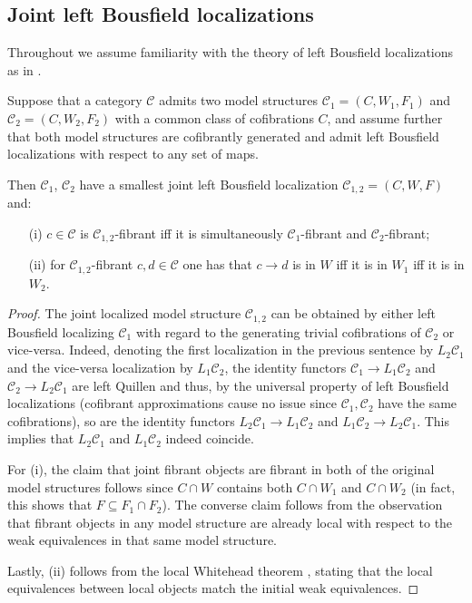 \documentclass[a4paper,10pt
 ,draft
]{article}%
\begin{document}
\subsection{Joint left Bousfield localizations}\label{JOINBOUS SEC}


Throughout we assume familiarity with the theory of left Bousfield localizations as in \cite{Hir03}.

\begin{proposition}\label{COMBMODSTR PROP}
	Suppose that a category $\mathcal{C}$
	admits two model structures $\mathcal{C}_1=(C,W_1,F_1)$ and $\mathcal{C}_2 = (C,W_2,F_2)$
	with a common class of cofibrations $C$,
	and assume further that both model structures are cofibrantly generated and admit left Bousfield localizations with respect to any set of maps.

	Then $\mathcal{C}_1$, $\mathcal{C}_2$ have a smallest joint left Bousfield localization 
	$\mathcal{C}_{1,2}=(C,W,F)$ and:
\begin{itemize}
	\item[(i)] $c \in \mathcal{C}$ is $\mathcal{C}_{1,2}$-fibrant iff it is simultaneously 
	$\mathcal{C}_{1}$-fibrant and $\mathcal{C}_{2}$-fibrant;
	\item[(ii)] for $\mathcal{C}_{1,2}$-fibrant  
	$c,d \in \mathcal{C}$ one has that $c\to d$ is in $W$ iff it is in $W_1$ iff it is in $W_2$.
\end{itemize}
\end{proposition}


\begin{proof}
The joint localized model structure $\mathcal{C}_{1,2}$ can be obtained by either left Bousfield localizing $\mathcal{C}_{1}$ with regard to the generating trivial cofibrations of $\mathcal{C}_{2}$ or vice-versa. Indeed, denoting the first localization in the previous sentence by $L_2 \mathcal{C}_1$ and the vice-versa localization by $L_1 \mathcal{C}_2$,
the identity functors 
$\mathcal{C}_1 \to L_1 \mathcal{C}_2$ and
$\mathcal{C}_2 \to L_2 \mathcal{C}_1$
are left Quillen and thus, by the universal property of left Bousfield localizations \cite[Prop. 3.3.18]{Hir03} (cofibrant approximations \cite[Def. 8.1.2]{Hir03} cause no issue since $\mathcal{C}_1,\mathcal{C}_2$ have the same cofibrations), so are the identity functors
$L_2 \mathcal{C}_1 \to L_1 \mathcal{C}_2$ and 
$L_1 \mathcal{C}_2 \to L_2 \mathcal{C}_1$. This implies that $L_2 \mathcal{C}_1$ and $L_1 \mathcal{C}_2$ indeed coincide.
	
For (i), the claim that joint fibrant objects are fibrant in both of the original model structures follows since $C \cap W$ contains both $C \cap W_1$ and $C \cap W_2$ (in fact, this shows that $F \subseteq F_1 \cap F_2$).
The converse claim follows from the observation that fibrant objects in any model structure are already local with respect to the weak equivalences in that same model structure.

Lastly, (ii) follows from the local Whitehead theorem \cite[Thm. 3.2.13]{Hir03}, stating that 
the local equivalences between local objects match the
initial weak equivalences.
\end{proof}
\end{document}
